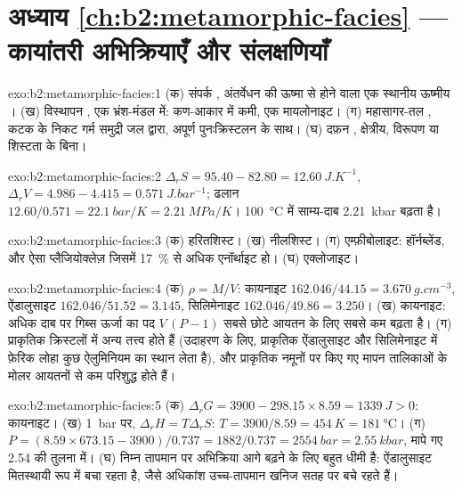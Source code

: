 \section*{अध्याय \ref{ch:b2:metamorphic-facies} --- कायांतरी अभिक्रियाएँ और संलक्षणियाँ}

\begin{solution}{exo:b2:metamorphic-facies:1}
(क) संपर्क , अंतर्वेधन की ऊष्मा से होने वाला एक स्थानीय ऊष्मीय ।
(ख) विस्थापन , एक भ्रंश-मंडल में: कण-आकार में कमी, एक मायलोनाइट।
(ग) महासागर-तल , कटक के निकट गर्म समुद्री जल द्वारा, अपूर्ण
पुनःक्रिस्टलन के साथ। (घ) दफ़न , क्षेत्रीय, विरूपण या
शिस्टता के बिना।
\end{solution}

\begin{solution}{exo:b2:metamorphic-facies:2}
$\Delta_r S = 95.40 - 82.80 = \qty{12.60}{J.K^{-1}}$, $\Delta_r V = 4.986 - 4.415 =
\qty{0.571}{J.bar^{-1}}$; ढलान $12.60/0.571 = \qty{22.1}{bar/K} = \qty{2.21}{MPa/K}$।
\qty{100}{\celsius} में साम्य-दाब \qty{2.21}{kbar} बढ़ता है।
\end{solution}

\begin{solution}{exo:b2:metamorphic-facies:3}
(क) हरितशिस्ट। (ख) नीलशिस्ट। (ग) एम्फ़ीबोलाइट: हॉर्नब्लेंड, और ऐसा प्लैजियोक्लेज़ जिसमें
\qty{17}{\percent} से अधिक एनॉर्थाइट हो। (घ) एक्लोजाइट।
\end{solution}

\begin{solution}{exo:b2:metamorphic-facies:4}
(क) $\rho = M/V$: कायनाइट $162.046/44.15 = \qty{3.670}{g.cm^{-3}}$, ऐंडालुसाइट
$162.046/51.52 = 3.145$, सिलिमेनाइट $162.046/49.86 = 3.250$। (ख) कायनाइट: अधिक
दाब पर गिब्स ऊर्जा का पद $V\,(P - 1)$ सबसे छोटे आयतन के लिए सबसे कम बढ़ता है।
(ग) प्राकृतिक क्रिस्टलों में अन्य तत्त्व होते हैं (उदाहरण के लिए, प्राकृतिक ऐंडालुसाइट और सिलिमेनाइट में फ़ेरिक लोहा
कुछ ऐलुमिनियम का स्थान लेता है), और प्राकृतिक नमूनों पर किए गए मापन
तालिकाओं के मोलर आयतनों से कम परिशुद्ध होते हैं।
\end{solution}

\begin{solution}{exo:b2:metamorphic-facies:5}
(क) $\Delta_r G = 3900 - 298.15\times8.59 = \qty{+1339}{J} > 0$: कायनाइट। (ख)
\qty{1}{bar} पर, $\Delta_r H = T\Delta_r S$: $T = 3900/8.59 = \qty{454}{K} =
\qty{181}{\celsius}$। (ग) $P = (8.59\times673.15 - 3900)/0.737 = 1882/0.737 =
\qty{2554}{bar} = \qty{2.55}{kbar}$, मापे गए 2.54 की तुलना में। (घ) निम्न तापमान पर अभिक्रिया
आगे बढ़ने के लिए बहुत धीमी है: ऐंडालुसाइट मितस्थायी रूप में बचा रहता है, जैसे अधिकांश उच्च-तापमान
खनिज सतह पर बचे रहते हैं।
\end{solution}

